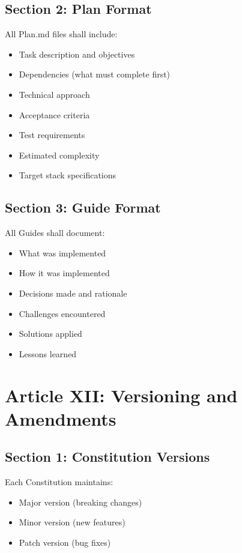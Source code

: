 \documentclass[12pt,letterpaper]{article}
\begin{document}
\subsection{Section 2: Plan Format}

All Plan.md files shall include:

\begin{itemize}
    \item Task description and objectives
    \item Dependencies (what must complete first)
    \item Technical approach
    \item Acceptance criteria
    \item Test requirements
    \item Estimated complexity
    \item Target stack specifications
\end{itemize}

\subsection{Section 3: Guide Format}

All Guides shall document:

\begin{itemize}
    \item What was implemented
    \item How it was implemented
    \item Decisions made and rationale
    \item Challenges encountered
    \item Solutions applied
    \item Lessons learned
\end{itemize}

\section{Article XII: Versioning and Amendments}

\subsection{Section 1: Constitution Versions}

Each Constitution maintains:

\begin{itemize}
    \item Major version (breaking changes)
    \item Minor version (new features)
    \item Patch version (bug fixes)
\end{itemize}
\end{document}
